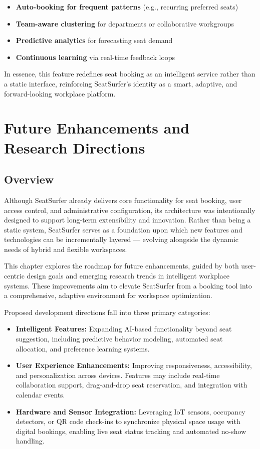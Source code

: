 \documentclass[12pt,a4paper]{report}
\begin{document}
\begin{itemize}
\item \textbf{Auto-booking for frequent patterns} (e.g., recurring preferred seats)
\item \textbf{Team-aware clustering} for departments or collaborative workgroups
\item \textbf{Predictive analytics} for forecasting seat demand
\item \textbf{Continuous learning} via real-time feedback loops
\end{itemize}

In essence, this feature redefines seat booking as an intelligent service rather than a static interface, reinforcing SeatSurfer's identity as a smart, adaptive, and forward-looking workplace platform.

\newpage

\chapter{Future Enhancements and Research Directions}

\section{Overview}

Although SeatSurfer already delivers core functionality for seat booking, user access control, and administrative configuration, its architecture was intentionally designed to support long-term extensibility and innovation. Rather than being a static system, SeatSurfer serves as a foundation upon which new features and technologies can be incrementally layered — evolving alongside the dynamic needs of hybrid and flexible workspaces.

This chapter explores the roadmap for future enhancements, guided by both user-centric design goals and emerging research trends in intelligent workplace systems. These improvements aim to elevate SeatSurfer from a booking tool into a comprehensive, adaptive environment for workspace optimization.

Proposed development directions fall into three primary categories:

\begin{itemize}
\item \textbf{Intelligent Features:}
Expanding AI-based functionality beyond seat suggestion, including predictive behavior modeling, automated seat allocation, and preference learning systems.
\item \textbf{User Experience Enhancements:}  
Improving responsiveness, accessibility, and personalization across devices. Features may include real-time collaboration support, drag-and-drop seat reservation, and integration with calendar events.
\item \textbf{Hardware and Sensor Integration:}  
Leveraging IoT sensors, occupancy detectors, or QR code check-ins to synchronize physical space usage with digital bookings, enabling live seat status tracking and automated no-show handling.
\end{itemize}
\end{document}
